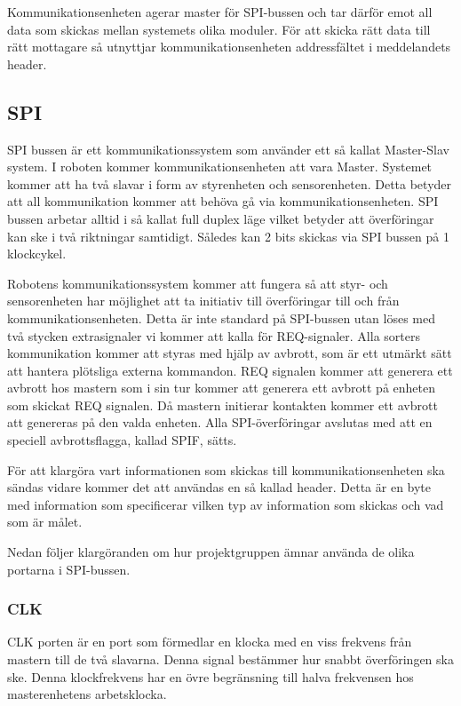 Kommunikationsenheten agerar master för SPI-bussen och tar därför emot all data
som skickas mellan systemets olika moduler. För att skicka rätt data till rätt
mottagare så utnyttjar kommunikationsenheten addressfältet i meddelandets
header.

\subsection{SPI}
\label{sec:SPI}
SPI bussen är ett kommunikationssystem som använder ett så kallat Master-Slav system. I roboten kommer kommunikationsenheten att vara Master. Systemet kommer att ha två slavar i form av styrenheten och sensorenheten.
Detta betyder att all kommunikation kommer att behöva gå via kommunikationsenheten. SPI bussen arbetar alltid i så kallat full duplex läge vilket betyder att överföringar kan ske i två riktningar samtidigt. Således kan 2 bits skickas via SPI bussen på 1 klockcykel. 

Robotens kommunikationssystem kommer att fungera så att styr- och sensorenheten har möjlighet att ta initiativ till överföringar till och från kommunikationsenheten. Detta är inte standard på SPI-bussen utan löses med två stycken extrasignaler vi kommer att kalla för REQ-signaler. Alla sorters kommunikation kommer att styras med hjälp av avbrott, som är ett utmärkt sätt att hantera plötsliga externa kommandon. REQ signalen kommer att generera ett avbrott hos mastern som i sin tur kommer att generera ett avbrott på enheten som skickat REQ signalen. Då mastern initierar kontakten kommer ett avbrott att genereras på den valda enheten. Alla SPI-överföringar avslutas med att en speciell avbrottsflagga, kallad SPIF, sätts.

För att klargöra vart informationen som skickas till kommunikationsenheten ska sändas vidare kommer det att användas en så kallad header. Detta är en byte med information som specificerar vilken typ av information som skickas och vad som är målet. 

Nedan följer klargöranden om hur projektgruppen ämnar använda de olika portarna i SPI-bussen. 


\subsubsection{CLK}

CLK porten är en port som förmedlar en klocka med en viss frekvens från mastern till de två slavarna. Denna signal bestämmer hur snabbt överföringen ska ske. Denna klockfrekvens har en övre begränsning till halva frekvensen hos masterenhetens arbetsklocka.


